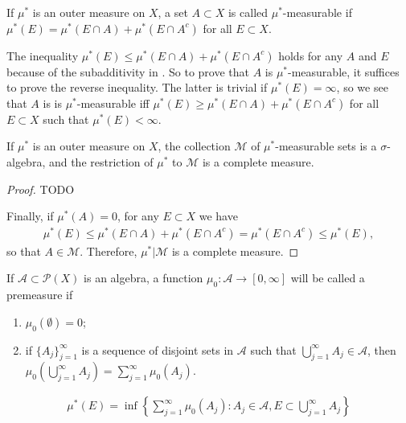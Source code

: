 \begin{definition}
If $\mu^*$ is an outer measure on $X$, a set $A \subset X$ is called $\mu^*$-measurable if $\mu^*(E) = \mu^*(E \cap A) + \mu^*(E \cap A^c)$ for all $E \subset X$.
\end{definition}

The inequality $\mu^*(E) \le \mu^*(E \cap A) + \mu^*(E \cap A^c)$ holds for any $A$ and $E$ because of the subadditivity in .
So to prove that $A$ is $\mu^*$-measurable, it suffices to prove the reverse inequality. 
The latter is trivial if $\mu^*(E) = \infty$, so we see that $A$ is is $\mu^*$-measurable iff $\mu^*(E) \ge \mu^*(E \cap A) + \mu^*(E \cap A^c)$ for all $E \subset X$ such that $\mu^*(E) < \infty$.

\begin{theorem}
If $\mu^*$ is an outer measure on $X$, the collection $\mathcal{M}$ of $\mu^*$-measurable sets is a $\sigma$-algebra, and the restriction of $\mu^*$ to $\mathcal{M}$ is a complete measure.
\end{theorem}

\begin{proof}
TODO

Finally, if $\mu^*(A) = 0$, for any $E \subset X$ we have
\begin{align}
\mu^*(E) \le \mu^*(E \cap A) + \mu^*(E \cap A^c) = \mu^*(E \cap A^c) \le \mu^*(E),
\end{align}
so that $A \in \mathcal{M}$.
Therefore, $\mu^*|\mathcal{M}$ is a complete measure.
\end{proof}

\begin{definition}[Premeasure]
If $\mathcal{A} \subset \mathcal{P}(X)$ is an algebra, a function $\mu_0: \mathcal{A} \to [0, \infty]$ will be called a premeasure if
\begin{enumerate}
    \item $\mu_0(\emptyset) = 0$;
    \item if $\{ A_j \}_{j=1}^{\infty}$ is a sequence of disjoint sets in $\mathcal{A}$ such that $\bigcup_{j=1}^{\infty} A_j \in \mathcal{A}$, then $\mu_0(\bigcup_{j=1}^{\infty} A_j) = \sum _{j=1}^{\infty} \mu_0(A_j)$.
\end{enumerate}
\end{definition}

\begin{align}
\mu^*(E) = \inf \left\{ \sum_{j=1}^{\infty} \mu_0(A_j) : A_j \in \mathcal{A}, E \subset \bigcup_{j=1}^{\infty} A_j \right\}
\end{align}

